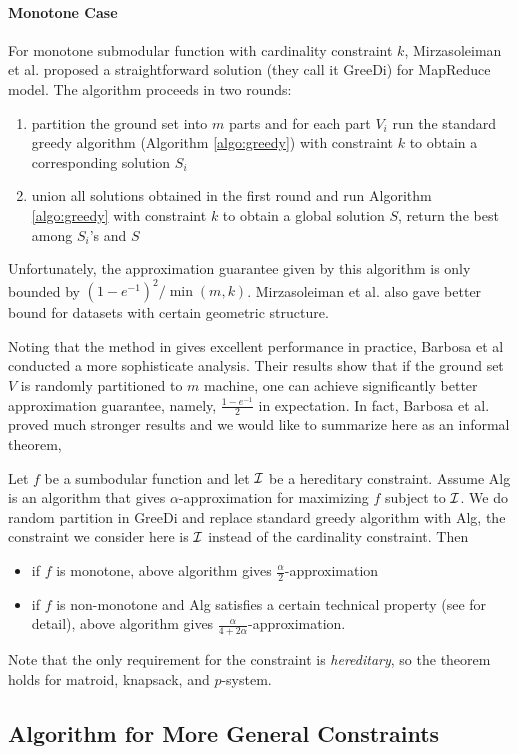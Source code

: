 \paragraph{Monotone Case}
For monotone submodular function with cardinality constraint $k$, Mirzasoleiman et al. \cite{MKS+13} proposed a straightforward solution (they call it {\sc GreeDi}) for MapReduce model. The algorithm proceeds in two rounds:
\begin{enumerate}
\item partition the ground set into $m$ parts and for each part $V_i$ run the standard greedy algorithm (Algorithm \ref{algo:greedy}) with constraint $k$ to obtain a corresponding solution $S_i$
\item union all solutions obtained in the first round and run Algorithm \ref{algo:greedy} with constraint $k$ to obtain a global solution $S$, return the best among $S_i$'s and $S$
\end{enumerate}

Unfortunately, the approximation guarantee given by this algorithm is only bounded by $(1 - e^{-1})^2/\min(m, k)$. Mirzasoleiman et al. \cite{MKS+13} also gave better bound for datasets with certain geometric structure.

Noting that the method in \cite{MKS+13} gives excellent performance in practice, Barbosa et al \cite{DEN+15} conducted a more sophisticate analysis. Their results show that if the ground set $V$ is randomly partitioned to $m$ machine, one can achieve significantly better approximation guarantee, namely, $\frac{1 - e^{-1}}{2}$ in expectation. In fact, Barbosa et al. \cite{DEN+15} proved much stronger results and we would like to summarize here as an informal theorem,
\begin{theorem}
  \label{thm:randomGreeDi}
  Let $f$ be a sumbodular function and let $\mathcal{I}$ be a hereditary constraint. Assume {\sc Alg} is an algorithm that gives $\alpha$-approximation for maximizing $f$ subject to $\mathcal{I}$. We do random partition in {\sc GreeDi} and replace standard greedy algorithm with {\sc Alg}, the constraint we consider here is $\mathcal{I}$ instead of the cardinality constraint. Then 
  \begin{itemize}
  \item if $f$ is monotone, above algorithm gives $\frac{\alpha}{2}$-approximation
  \item if $f$ is non-monotone and {\sc Alg} satisfies a certain technical property (see \cite{DEN+15} for detail), above algorithm gives $\frac{\alpha}{4 + 2\alpha}$-approximation.
  \end{itemize}
\end{theorem}
Note that the only requirement for the constraint is \emph{hereditary}, so the theorem holds for matroid, knapsack, and $p$-system.



\subsection{Algorithm for More General Constraints}
